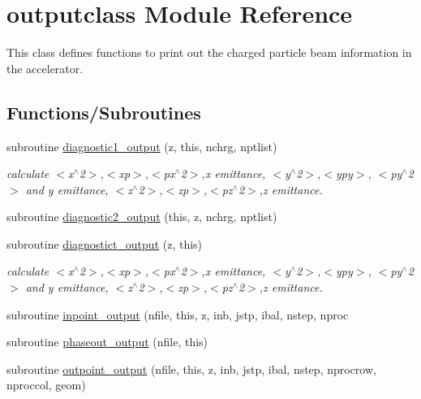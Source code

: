 \hypertarget{namespaceoutputclass}{}\section{outputclass Module Reference}
\label{namespaceoutputclass}


This class defines functions to print out the charged particle beam information in the accelerator.  


\subsection*{Functions/\+Subroutines}
\begin{DoxyCompactItemize}
\item 
subroutine \mbox{\hyperlink{namespaceoutputclass_aa94732fb01ea05e3a65d2cb9aa5a0402}{diagnostic1\+\_\+output}} (z, this, nchrg, nptlist)
\begin{DoxyCompactList}\small\item\em calculate $<$x$^\wedge$2$>$,$<$xp$>$,$<$px$^\wedge$2$>$,x emittance, $<$y$^\wedge$2$>$,$<$ypy$>$, $<$py$^\wedge$2$>$ and y emittance, $<$z$^\wedge$2$>$,$<$zp$>$,$<$pz$^\wedge$2$>$,z emittance. \end{DoxyCompactList}\item 
subroutine \mbox{\hyperlink{namespaceoutputclass_a678b3c4ce8356d742c32eb555ee16f08}{diagnostic2\+\_\+output}} (this, z, nchrg, nptlist)
\item 
subroutine \mbox{\hyperlink{namespaceoutputclass_a4df9d27795de9f5c2d2a8827e2cb7adf}{diagnostict\+\_\+output}} (z, this)
\begin{DoxyCompactList}\small\item\em calculate $<$x$^\wedge$2$>$,$<$xp$>$,$<$px$^\wedge$2$>$,x emittance, $<$y$^\wedge$2$>$,$<$ypy$>$, $<$py$^\wedge$2$>$ and y emittance, $<$z$^\wedge$2$>$,$<$zp$>$,$<$pz$^\wedge$2$>$,z emittance. \end{DoxyCompactList}\item 
subroutine \mbox{\hyperlink{namespaceoutputclass_a4ad23aaddd82d8307416875d28e5c512}{inpoint\+\_\+output}} (nfile, this, z, inb, jstp, ibal, nstep, nproc
\item 
subroutine \mbox{\hyperlink{namespaceoutputclass_a92eb6a8aec3f143754010f6e417e8ac2}{phaseout\+\_\+output}} (nfile, this)
\item 
subroutine \mbox{\hyperlink{namespaceoutputclass_a15a58393664c8a9ded7a8e259fc511e8}{outpoint\+\_\+output}} (nfile, this, z, inb, jstp, ibal, nstep, nprocrow, nproccol, geom)

\end{DoxyCompactItemize}
